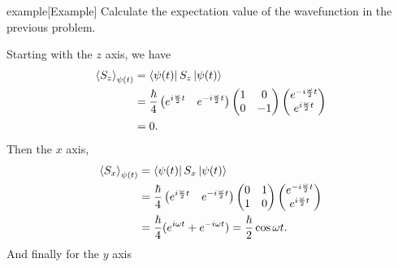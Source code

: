 \documentclass{article}
\begin{document}
\begin{callout}{example}[Example]
\label{example:s3-e3}
Calculate the expectation value of the wavefunction in the previous problem.

Starting with the $z$ axis, we have
\begin{align}
    \left\langle S_z \right\rangle _{\psi (t)} &= \bra{\psi (t)}S_z \ket{\psi (t)} \nonumber\\
                                               &= \frac{\hbar}{4}\left(e^{i \frac{\omega }{2}t}\quad e^{-i \frac{\omega }{2}t}\right)\begin{pmatrix}
                                                   1 & 0 \\ 0 & -1
                                               \end{pmatrix}\begin{pmatrix}
                                                   e^{-i \frac{\omega }{2}t} \\
                                                   e^{i \frac{\omega }{2}t}
                                               \end{pmatrix} \nonumber\\
                                               &= 0. \label{eq:s3-e1}
\end{align}
Then the $x$ axis,
\begin{align}
    \left\langle S_x \right\rangle _{\psi (t)} &= \bra{\psi (t)}S_x \ket{\psi (t)} \nonumber\\
                                               &= \frac{\hbar}{4}\left( e^{i \frac{\omega }{2}t}\quad e^{-i \frac{\omega }{2}t} \right)\begin{pmatrix}
                                                   0 & 1 \\ 1 & 0
                                               \end{pmatrix}\begin{pmatrix}
                                                   e^{-i \frac{\omega }{2}t} \\
                                                   e^{i \frac{\omega }{2}t}
                                               \end{pmatrix} \nonumber\\
                                               &= \frac{\hbar}{4}(e^{i\omega t}+e^{-i\omega t})=\frac{\hbar}{2}\cos\omega t. \label{eq:s3-e2}
\end{align}
And finally for the $y$ axis
\begin{align}

\end{align}
\end{callout}
\end{document}

